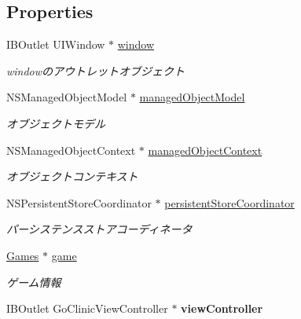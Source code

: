 \subsection*{Properties}
\begin{DoxyCompactItemize}
\item 
\hypertarget{interface_go_clinic_app_delegate_a5527da2631d02a15751dacfe76d61b4f}{
IBOutlet UIWindow $\ast$ \hyperlink{interface_go_clinic_app_delegate_a5527da2631d02a15751dacfe76d61b4f}{window}}
\label{interface_go_clinic_app_delegate_a5527da2631d02a15751dacfe76d61b4f}

\begin{DoxyCompactList}\small\item\em windowのアウトレットオブジェクト \end{DoxyCompactList}\item 
NSManagedObjectModel $\ast$ \hyperlink{interface_go_clinic_app_delegate_a83de9dbffc02726a241ab93c8a130ccf}{managedObjectModel}
\begin{DoxyCompactList}\small\item\em オブジェクトモデル \end{DoxyCompactList}\item 
NSManagedObjectContext $\ast$ \hyperlink{interface_go_clinic_app_delegate_a56340d41d4eb164878497e7b9ee3fcf6}{managedObjectContext}
\begin{DoxyCompactList}\small\item\em オブジェクトコンテキスト \end{DoxyCompactList}\item 
NSPersistentStoreCoordinator $\ast$ \hyperlink{interface_go_clinic_app_delegate_acec743b348a53b0628186921e68af000}{persistentStoreCoordinator}
\begin{DoxyCompactList}\small\item\em パーシステンスストアコーディネータ \end{DoxyCompactList}\item 
\hypertarget{interface_go_clinic_app_delegate_ad15d58435f683d3fbd740b82a60d6866}{
\hyperlink{interface_games}{Games} $\ast$ \hyperlink{interface_go_clinic_app_delegate_ad15d58435f683d3fbd740b82a60d6866}{game}}
\label{interface_go_clinic_app_delegate_ad15d58435f683d3fbd740b82a60d6866}

\begin{DoxyCompactList}\small\item\em ゲーム情報 \end{DoxyCompactList}\item 
\hypertarget{interface_go_clinic_app_delegate_aeef0b36666cba4be3bd15cfe1c1aacdb}{
IBOutlet GoClinicViewController $\ast$ {\bfseries viewController}}
\label{interface_go_clinic_app_delegate_aeef0b36666cba4be3bd15cfe1c1aacdb}

\end{DoxyCompactItemize}


